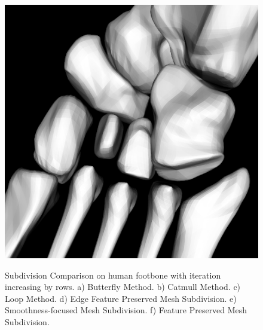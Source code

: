 \documentclass[10pt, conference, compsocconf]{IEEEtran}
\begin{document}
\begin{figure}[htbp]
{\begin{minipage}[h]{0.16\linewidth}
        \includegraphics[width=\textwidth]{./Figure/footbones/middle/kpw3.png}\vspace{1ex}\\
      \end{minipage}
  }

  \caption{Subdivision Comparison on human footbone with iteration increasing by rows. a) Butterfly Method. b) Catmull Method. c) Loop Method. d) Edge Feature Preserved Mesh Subdivision. e) Smoothness-focused Mesh Subdivision. f) Feature Preserved Mesh Subdivision.}\label{Figure_KFPMS_2}
\end{figure}
\end{document}
